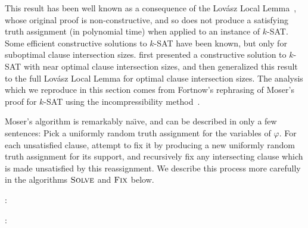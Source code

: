 \documentclass[format=acmsmall, review=false, screen=true]{acmart}
\begin{document}
This result has been well known as a consequence of the Lov\'{a}sz
Local Lemma~\cite{lovasz:locallemma}, whose original proof is
non-constructive, and so does not produce a satisfying truth
assignment (in polynomial time) when applied to an instance of
$k$-SAT. Some efficient constructive solutions to $k$-SAT have been
known, but only for suboptimal clause intersection sizes.
 first presented a constructive solution to
$k$-SAT with near optimal clause intersection sizes, and 
 then generalized this result to the
full Lov\'{a}sz Local Lemma for optimal clause intersection sizes. The
analysis which we reproduce in this section comes from Fortnow's
rephrasing of Moser's proof for $k$-SAT using the incompressibility
method~\cite{fortnow:ksat}.

Moser's algorithm is remarkably na\"\i ve, and can be described in only a
few sentences: Pick a uniformly random truth assignment for the
variables of $\varphi$. For each unsatisfied clause, attempt to fix it
by producing a new uniformly random truth assignment for its support,
and recursively fix any intersecting clause which is made unsatisfied
by this reassignment. We describe this process more carefully in the
algorithms $\textsc{Solve}$ and $\textsc{Fix}$ below.

:
\begin{algorithmic}[1]
  \ENDWHILE
  \RETURN{$\alpha$}
\end{algorithmic}

:
\begin{algorithmic}[1]
  \ENDWHILE
  \RETURN{$\alpha$}
\end{algorithmic}
\end{document}
